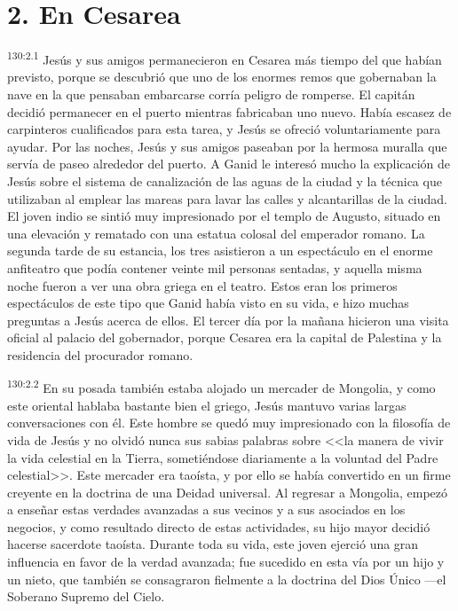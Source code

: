 \section*{2. En Cesarea}
\par 
\textsuperscript{130:2.1} Jesús y sus amigos permanecieron en Cesarea más tiempo del que habían previsto, porque se descubrió que uno de los enormes remos que gobernaban la nave en la que pensaban embarcarse corría peligro de romperse. El capitán decidió permanecer en el puerto mientras fabricaban uno nuevo. Había escasez de carpinteros cualificados para esta tarea, y Jesús se ofreció voluntariamente para ayudar. Por las noches, Jesús y sus amigos paseaban por la hermosa muralla que servía de paseo alrededor del puerto. A Ganid le interesó mucho la explicación de Jesús sobre el sistema de canalización de las aguas de la ciudad y la técnica que utilizaban al emplear las mareas para lavar las calles y alcantarillas de la ciudad. El joven indio se sintió muy impresionado por el templo de Augusto, situado en una elevación y rematado con una estatua colosal del emperador romano. La segunda tarde de su estancia, los tres asistieron a un espectáculo en el enorme anfiteatro que podía contener veinte mil personas sentadas, y aquella misma noche fueron a ver una obra griega en el teatro. Estos eran los primeros espectáculos de este tipo que Ganid había visto en su vida, e hizo muchas preguntas a Jesús acerca de ellos. El tercer día por la mañana hicieron una visita oficial al palacio del gobernador, porque Cesarea era la capital de Palestina y la residencia del procurador romano.

\par 
\textsuperscript{130:2.2} En su posada también estaba alojado un mercader de Mongolia, y como este oriental hablaba bastante bien el griego, Jesús mantuvo varias largas conversaciones con él. Este hombre se quedó muy impresionado con la filosofía de vida de Jesús y no olvidó nunca sus sabias palabras sobre <<la manera de vivir la vida celestial en la Tierra, sometiéndose diariamente a la voluntad del Padre celestial>>. Este mercader era taoísta, y por ello se había convertido en un firme creyente en la doctrina de una Deidad universal. Al regresar a Mongolia, empezó a enseñar estas verdades avanzadas a sus vecinos y a sus asociados en los negocios, y como resultado directo de estas actividades, su hijo mayor decidió hacerse sacerdote taoísta. Durante toda su vida, este joven ejerció una gran influencia en favor de la verdad avanzada; fue sucedido en esta vía por un hijo y un nieto, que también se consagraron fielmente a la doctrina del Dios Único ---el Soberano Supremo del Cielo.

